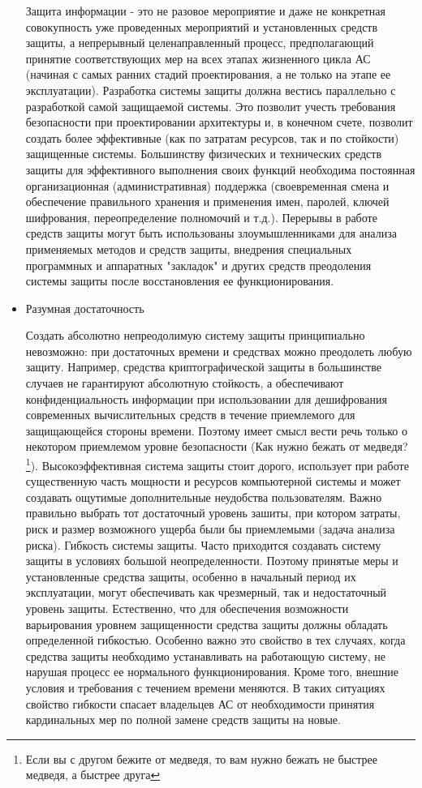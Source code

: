 \begin{itemize}
Защита информации - это не разовое мероприятие и даже не конкретная совокупность уже проведенных мероприятий и установленных средств защиты, а непрерывный целенаправленный процесс, предполагающий принятие соответствующих мер на всех этапах жизненного цикла АС (начиная с самых ранних стадий проектирования, а не только на этапе ее эксплуатации). Разработка системы защиты должна вестись параллельно с разработкой самой защищаемой системы. Это позволит учесть требования безопасности при проектировании архитектуры и, в конечном счете, позволит создать более эффективные (как по затратам ресурсов, так и по стойкости) защищенные системы. Большинству физических и технических средств защиты для эффективного выполнения своих функций необходима постоянная организационная (административная) поддержка (своевременная смена и обеспечение правильного хранения и применения имен, паролей, ключей шифрования, переопределение полномочий и т.д.). Перерывы в работе средств защиты могут быть использованы злоумышленниками для анализа применяемых методов и средств защиты, внедрения специальных программных и аппаратных "закладок" и других средств преодоления системы защиты после восстановления ее функционирования.

\item Разумная достаточность

Создать абсолютно непреодолимую систему защиты принципиально невозможно: при достаточных времени и средствах можно преодолеть любую защиту. Например, средства криптографической защиты в большинстве случаев не гарантируют абсолютную стойкость, а обеспечивают конфиденциальность информации при использовании для дешифрования современных вычислительных средств в течение приемлемого для защищающейся стороны времени. Поэтому имеет смысл вести речь только о некотором приемлемом уровне безопасности (Как нужно бежать от медведя? \footnote{Если вы с другом бежите от медведя, то вам нужно бежать не быстрее медведя, а быстрее друга}). Высокоэффективная система защиты стоит дорого, использует при работе существенную часть мощности и ресурсов компьютерной системы и может создавать ощутимые дополнительные неудобства пользователям. Важно правильно выбрать тот достаточный уровень зашиты, при котором затраты, риск и размер возможного ущерба были бы приемлемыми (задача анализа риска). Гибкость системы защиты. Часто приходится создавать систему защиты в условиях большой неопределенности. Поэтому принятые меры и установленные средства защиты, особенно в начальный период их эксплуатации, могут обеспечивать как чрезмерный, так и недостаточный уровень защиты. Естественно, что для обеспечения возможности варьирования уровнем защищенности средства защиты должны обладать определенной гибкостью. Особенно важно это свойство в тех случаях, когда средства защиты необходимо устанавливать на работающую систему, не нарушая процесс ее нормального функционирования. Кроме того, внешние условия и требования с течением времени меняются. В таких ситуациях свойство гибкости спасает владельцев АС от необходимости принятия кардинальных мер по полной замене средств защиты на новые.


\end{itemize}
